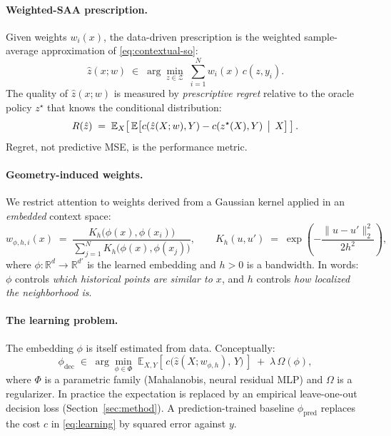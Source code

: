 \documentclass[11pt]{article}
\begin{document}
\paragraph{Weighted-SAA prescription.}
Given weights $w_i(x)$, the data-driven prescription is the weighted sample-average approximation of \eqref{eq:contextual-so}:
\begin{equation}\label{eq:wSAA}
\hat z(x;w) \;\in\; \arg\min_{z\in\mathcal Z}\; \sum_{i=1}^N w_i(x)\, c(z,y_i).
\end{equation}
The quality of $\hat z(x;w)$ is measured by \emph{prescriptive regret} relative to the oracle policy $z^\star$ that knows the conditional distribution:
\begin{equation}\label{eq:regret}
R(\hat z) \;=\; \mathbb E_{X}\!\left[\,\mathbb E\bigl[c(\hat z(X;w),Y) - c(z^\star(X),Y)\,\bigm|\, X\bigr]\,\right].
\end{equation}
Regret, not predictive MSE, is the performance metric.

\paragraph{Geometry-induced weights.}
We restrict attention to weights derived from a Gaussian kernel applied in an \emph{embedded} context space:
\begin{equation}\label{eq:kernel-weights}
w_{\phi,h,i}(x) \;=\; \frac{K_h\bigl(\phi(x),\phi(x_i)\bigr)}{\sum_{j=1}^N K_h\bigl(\phi(x),\phi(x_j)\bigr)},
\qquad
K_h(u,u') \;=\; \exp\!\left(-\frac{\|u-u'\|_2^2}{2h^2}\right),
\end{equation}
where $\phi:\mathbb R^d\to\mathbb R^{d'}$ is the learned embedding and $h>0$ is a bandwidth. In words: $\phi$ controls \emph{which historical points are similar to $x$}, and $h$ controls \emph{how localized the neighborhood is}.

\paragraph{The learning problem.}
The embedding $\phi$ is itself estimated from data. Conceptually:
\begin{equation}\label{eq:learning}
\phi_{\mathrm{dec}} \;\in\; \arg\min_{\phi \in \Phi}\;
\mathbb E_{X,Y}\!\left[\,c\bigl(\hat z(X;w_{\phi,h}),\,Y\bigr)\,\right]
\;+\; \lambda\,\Omega(\phi),
\end{equation}
where $\Phi$ is a parametric family (Mahalanobis, neural residual MLP) and $\Omega$ is a regularizer. In practice the expectation is replaced by an empirical leave-one-out decision loss (Section~\ref{sec:method}). A prediction-trained baseline $\phi_{\mathrm{pred}}$ replaces the cost $c$ in \eqref{eq:learning} by squared error against $y$.
\end{document}
